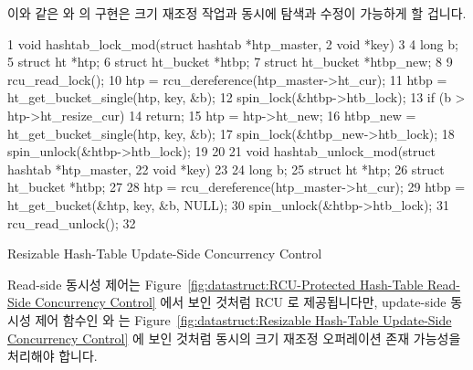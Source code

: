 이와 같은  와  의 구현은 크기
재조정 작업과 동시에 탐색과 수정이 가능하게 할 겁니다.

\begin{listing}[tb]
{ \scriptsize
\begin{verbbox}
 1 void hashtab_lock_mod(struct hashtab *htp_master,
 2                       void *key)
 3 {
 4   long b;
 5   struct ht *htp;
 6   struct ht_bucket *htbp;
 7   struct ht_bucket *htbp_new;
 8 
 9   rcu_read_lock();
10   htp = rcu_dereference(htp_master->ht_cur);
11   htbp = ht_get_bucket_single(htp, key, &b);
12   spin_lock(&htbp->htb_lock);
13   if (b > htp->ht_resize_cur)
14     return;
15   htp = htp->ht_new;
16   htbp_new = ht_get_bucket_single(htp, key, &b);
17   spin_lock(&htbp_new->htb_lock);
18   spin_unlock(&htbp->htb_lock);
19 }
20 
21 void hashtab_unlock_mod(struct hashtab *htp_master,
22                         void *key)
23 {
24   long b;
25   struct ht *htp;
26   struct ht_bucket *htbp;
27 
28   htp = rcu_dereference(htp_master->ht_cur);
29   htbp = ht_get_bucket(&htp, key, &b, NULL);
30   spin_unlock(&htbp->htb_lock);
31   rcu_read_unlock();
32 }
\end{verbbox}
}
\centering
\theverbbox
\caption{Resizable Hash-Table Update-Side Concurrency Control}
\label{lst:datastruct:Resizable Hash-Table Update-Side Concurrency Control}
\end{listing}

Read-side 동시성 제어는
Figure~\ref{fig:datastruct:RCU-Protected Hash-Table Read-Side Concurrency Control}
에서 보인 것처럼 RCU 로 제공됩니다만, update-side 동시성 제어 함수인
 와  는
Figure~\ref{fig:datastruct:Resizable Hash-Table Update-Side Concurrency Control}
에 보인 것처럼 동시의 크기 재조정 오퍼레이션 존재 가능성을 처리해야 합니다.

